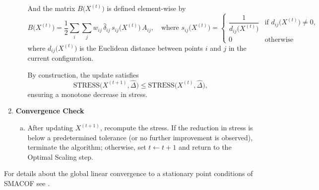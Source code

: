 \begin{enumerate}
\begin{enumerate}[(a)]
        \hspace{1em}And the matrix \(B\bigl(X^{(t)}\bigr)\) is defined element-wise by
          \[
            B\bigl(X^{(t)}\bigr) = \frac{1}{2} \sum_i \sum_j w_{ij} \, \hat{\delta}_{ij} \, s_{ij}\bigl(X^{(t)}\bigr) \, A_{ij}, \quad \text{where } s_{ij}\bigl(X^{(t)}\bigr) = \begin{cases} \dfrac{1}{d_{ij}\bigl(X^{(t)}\bigr)} & \text{if } d_{ij}\bigl(X^{(t)}\bigr) \neq 0, \\ 0 & \text{otherwise} \end{cases}
          \]
          \hspace{1em}where \(d_{ij}\bigl(X^{(t)}\bigr)\) is the Euclidean distance between points \(i\) and \(j\) in the current configuration.

      By construction, the update satisfies
      \[
        \mathrm{STRESS}\bigl(X^{(t+1)},\hat{\Delta}\bigr) \le \mathrm{STRESS}\bigl(X^{(t)},\hat{\Delta}\bigr),
      \]
      ensuring a monotone decrease in stress.
    \end{enumerate}

  \item \textbf{Convergence Check}
    \begin{enumerate}[(a)]
      \item After updating $X^{(t+1)}$, recompute the stress. If the reduction in stress is below a predetermined tolerance (or no further improvement is observed), terminate the algorithm; otherwise, set $t\leftarrow t+1$ and return to the Optimal Scaling step.
    \end{enumerate}
\end{enumerate}


For details about the global linear convergence to a stationary point conditions of SMACOF see \cite{smacof}.

